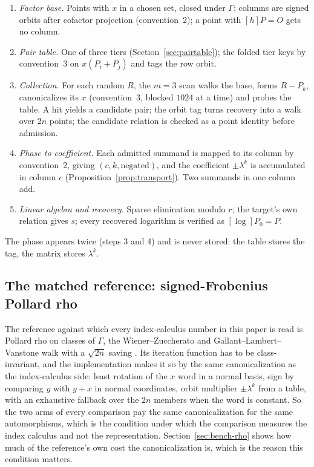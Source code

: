 \begin{enumerate}[leftmargin=1.6em,itemsep=0.2em]
\item \emph{Factor base.} Points with $x$ in a chosen set, closed
  under $\Gamma$; columns are signed orbits after cofactor
  projection (convention~2); a point with $[h]P=O$ gets no column.
\item \emph{Pair table.} One of three tiers
  (Section~\ref{sec:pairtable}); the folded tier keys by
  convention~3 on $x(P_i+P_j)$ and tags the row orbit.
\item \emph{Collection.} For each random $R$, the $m=3$ scan walks
  the base, forms $R-P_k$, canonicalizes its $x$ (convention~3,
  blocked $1024$ at a time) and probes the table. A hit yields a
  candidate pair; the orbit tag turns recovery into a walk over $2n$
  points; the candidate relation is checked as a point identity
  before admission.
\item \emph{Phase to coefficient.} Each admitted summand is mapped to
  its column by convention~2, giving $(c,k,\text{negated})$, and the
  coefficient $\pm\lambda^{k}$ is accumulated in column $c$
  (Proposition~\ref{prop:transport}). Two summands in one column add.
\item \emph{Linear algebra and recovery.} Sparse elimination modulo
  $r$; the target's own relation gives $s$; every recovered logarithm
  is verified as $[\log]P_0=P$.
\end{enumerate}
The phase appears twice (steps 3 and 4) and is never stored: the
table stores the tag, the matrix stores $\lambda^k$.

\subsection{The matched reference: signed-Frobenius Pollard rho}
\label{sec:rho-ref}

The reference against which every index-calculus number in this paper
is read is Pollard rho on classes of $\Gamma$, the Wiener--Zuccherato
and Gallant--Lambert--Vanstone walk with a $\sqrt{2n}$ saving
\citep{wienerzuccherato1998,glv2001}. Its iteration function has to
be class-invariant, and the implementation makes it so by the same
canonicalization as the index-calculus side: least rotation of the
$x$ word in a normal basis, sign by comparing $y$ with $y+x$ in
normal coordinates, orbit multiplier $\pm\lambda^k$ from a table,
with an exhaustive fallback over the $2n$ members when the word is
constant. So the two arms of every comparison pay the same canonicalization
for the same automorphisms, which is the condition under which the
comparison measures the index calculus and not the representation.
Section~\ref{sec:bench-rho} shows how much of the reference's own cost
the canonicalization is, which is the reason this condition matters.

